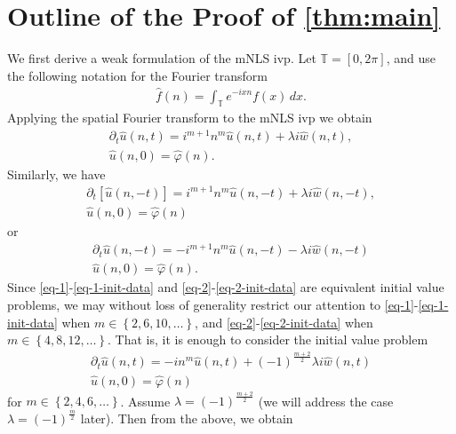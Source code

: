 \documentclass[12pt,reqno]{amsart}
\numberwithin{equation}{section}  %
\numberwithin{figure}{section}
\newcommand{\ci}{\mathbb{T}}
\newcommand{\p}{\partial}
\newcommand{\vp}{\varphi}
\theoremstyle{plain}
\theoremstyle{definition}
\theoremstyle{remark}
\begin{document}
\section{Outline of the Proof of \autoref{thm:main}}
%
%
%
%
%
We first derive a weak formulation of the mNLS ivp. 
Let $\ci = [0, 2 \pi]$, and use
the following notation for the Fourier transform
%
%
%
%
\begin{equation}
	\label{four-trans-pde}
	\begin{split}
    \widehat{f}(n) = \int_{\ci} e^{-ix n} f(x) \, dx.
	\end{split}
\end{equation}
Applying the spatial Fourier transform to the mNLS ivp we obtain
%
%
\begin{gather}
  \p_t \widehat{u}(n, t) = i^{m+1} n^m \widehat{u}(n, t) + \lambda i  
	\widehat{w} (n, t),
  \label{eq-1}
	\\
	\widehat{u} (n,0) = \widehat{\vp}(n)
  \label{eq-1-init-data}.
\end{gather}
%
%
Similarly, we have 
\begin{gather*}
  \p_t [\widehat{u}(n, -t)] =
  i^{m+1} n^m \widehat{u}(n, -t) + \lambda i  
	\widehat{w} (n, -t),
  \\
  \widehat{u} (n,0) = \widehat{\vp}(n)
\end{gather*}
or
\begin{gather}
  \label{eq-2}
  \p_t \widehat{u}(n, -t) = -i^{m+1} n^m \widehat{u}(n, -t) - \lambda i  
	\widehat{w} (n, -t)
  \\
\widehat{u} (n,0) = \widehat{\vp}(n)
  \label{eq-2-init-data}.
\end{gather}
Since \eqref{eq-1}-\eqref{eq-1-init-data} and
\eqref{eq-2}-\eqref{eq-2-init-data} are equivalent initial value problems, we
may without loss of generality restrict our attention to
\eqref{eq-1}-\eqref{eq-1-init-data} when $m \in \left\{ 2, 6, 10, \dots
\right\}$, and \eqref{eq-2}-\eqref{eq-2-init-data} when $m \in \left\{ 4, 8, 12,
\dots
\right\}$. That is, it is enough to consider the initial value problem   
%
%
\begin{gather}
  \label{hk}
  \p_t \widehat{u}(n, t) = -i n^m \widehat{u}(n, t) + (-1)^{\frac{m+2}{2}} \lambda i  
  \widehat{w} (n, t)	\\
	\widehat{u} (n,0) = \widehat{\vp}(n)
\end{gather}
for $m \in \left\{ 2, 4, 6, \dots \right\}$.
Assume $\lambda = (-1)^{\frac{m+2}{2}}$ (we will address the case $\lambda =
(-1)^{\frac{m}{2}}$ later). Then from the above, we obtain 
\end{document}

